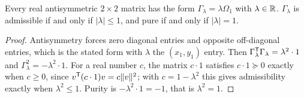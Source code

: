 \begin{proposition}\label{prop:one-mode}
Every real antisymmetric $2\times2$ matrix has the form
$\Gamma_\lambda=\lambda\Omega_1$ with $\lambda\in\mathbb R$. $\Gamma_\lambda$ is admissible
if and only if $|\lambda|\leq1$, and pure if and only if $|\lambda|=1$.
\end{proposition}
\begin{proof}
Antisymmetry forces zero diagonal entries and opposite off-diagonal entries, which
is the stated form with $\lambda$ the $(x_1,y_1)$ entry. Then
$\Gamma_\lambda^{\mathsf T}\Gamma_\lambda=\lambda^2\cdot1$ and
$\Gamma_\lambda^2=-\lambda^2\cdot1$. For a real number $c$, the matrix $c\cdot1$
satisfies $c\cdot1\succeq0$ exactly when $c\geq0$, since $v^{\mathsf T}(c\cdot1)v=c\|v\|^2$;
with $c=1-\lambda^2$ this gives admissibility exactly when $\lambda^2\leq1$. Purity
is $-\lambda^2\cdot1=-1$, that is $\lambda^2=1$.
\end{proof}
